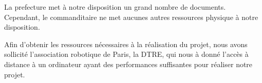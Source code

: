 
La prefecture met à notre disposition un grand nombre de documents.
Cependant, le commanditaire ne met aucunes autres ressources physique à notre disposition.


Afin d'obtenir les ressources nécessaires à la réalisation du projet, nous avons sollicité l'association robotique de Paris, la DTRE, qui nous à donné l'accès à distance à un ordinateur ayant des performances suffisantes pour réaliser notre projet.

